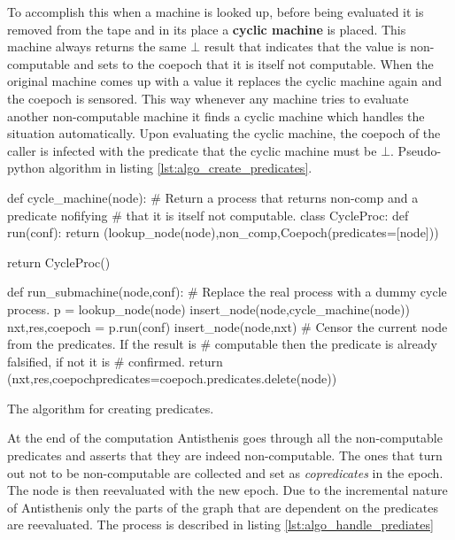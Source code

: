 To accomplish this when a machine is looked up, before being evaluated
it is removed from the tape and in its place a \textbf{cyclic machine}
is placed. This machine always returns the same \(\bot\) result that
indicates that the value is non-computable and sets to the coepoch
that it is itself not computable. When the original machine comes up
with a value it replaces the cyclic machine again and the coepoch is
sensored. This way whenever any machine tries to evaluate another
non-computable machine it finds a cyclic machine which handles the
situation automatically. Upon evaluating the cyclic machine, the
coepoch of the caller is infected with the predicate that the cyclic
machine must be \(\bot\). Pseudo-python algorithm in listing
\ref{lst:algo_create_predicates}.

\begin{code}
\begin{pycode}
def cycle_machine(node):
    # Return a process that returns non-comp and a predicate nofifying
    # that it is itself not computable.
    class CycleProc:
        def run(conf):
           return (lookup_node(node),non_comp,Coepoch(predicates=[node]))

    return CycleProc()

def run_submachine(node,conf):
    # Replace the real process with a dummy cycle process.
    p = lookup_node(node)
    insert_node(node,cycle_machine(node))
    nxt,res,coepoch = p.run(conf)
    insert_node(node,nxt)
    # Censor the current node from the predicates. If the result is
    # computable then the predicate is already falsified, if not it is
    # confirmed.
    return (nxt,res,coepoch{predicates=coepoch.predicates.delete(node)})
\end{pycode}
\label{lst:algo_create_predicates}
\caption{The algorithm for creating predicates.}
\end{code}

At the end of the computation Antisthenis goes through all the
non-computable predicates and asserts that they are indeed
non-computable. The ones that turn out not to be non-computable are
collected and set as \emph{copredicates} in the epoch. The node is
then reevaluated with the new epoch. Due to the incremental nature of
Antisthenis only the parts of the graph that are dependent on the
predicates are reevaluated. The process is described in listing
\ref{lst:algo_handle_prediates}

